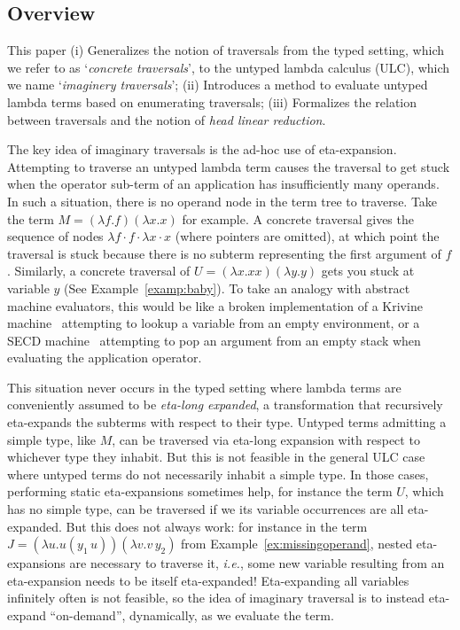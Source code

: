 \documentclass{elsarticle}
\makeatletter
\theoremstyle{plain}
\theoremstyle{definition}
\theoremstyle{remark}
\renewcommand\ie{{\it i.e.\@\xspace}}
\makeatother
\begin{document}
\subsection{Overview}
This paper
(i) Generalizes the notion of traversals from the typed setting, which we refer to as `\emph{concrete traversals}', to the untyped lambda calculus (ULC), which we name `\emph{imaginery traversals}';
(ii) Introduces a method to evaluate untyped lambda terms based on enumerating traversals;
(iii) Formalizes the relation between traversals and the notion of \emph{head linear reduction}.

The key idea of imaginary traversals is the ad-hoc use of eta-expansion. Attempting to traverse an untyped lambda term causes the traversal to get stuck when the operator sub-term of an application has insufficiently many operands. In such a situation, there is no operand node in the term tree to traverse. Take the term $M = (\lambda f.f)(\lambda x.x)$ for example. A concrete traversal gives the sequence of nodes $\lambda f \cdot f \cdot \lambda x \cdot x$ (where pointers are omitted), at which point the traversal is stuck because there is no subterm representing the first argument of $f$.
Similarly, a concrete traversal of $U = (\lambda x. x x)(\lambda y. y)$ gets you stuck at variable $y$ (See Example~\ref{examp:baby}). To take an analogy with abstract machine evaluators, this would be like a broken implementation of a Krivine machine~\cite{Krivine2007} attempting to lookup a variable from an empty environment, or a SECD machine~\cite{landin-secd} attempting to pop an argument from an empty stack when evaluating the application operator.

This situation never occurs in the typed setting where lambda terms are
conveniently assumed to be \emph{eta-long expanded}, a transformation that recursively eta-expands the subterms with respect to their type. Untyped terms admitting a simple type, like $M$, can be traversed via eta-long expansion with respect to whichever type they inhabit.
But this is not feasible in the general ULC case where untyped terms do not necessarily inhabit a simple type. In those cases, performing static eta-expansions sometimes help, for instance the term $U$, which has no simple type, can be traversed if we its variable occurrences are all eta-expanded. But this does not always work: for instance in the term
 $J = (\lambda u . u(y_1\, u)) (\lambda v . v\, y_2)$ from
 Example~\ref{ex:missingoperand}, nested eta-expansions are necessary to traverse it, \ie, some new variable resulting from an eta-expansion needs to be itself eta-expanded! Eta-expanding all variables infinitely often is not feasible, so the idea of imaginary traversal is to instead eta-expand ``on-demand'', dynamically, as we evaluate the term.
\end{document}
